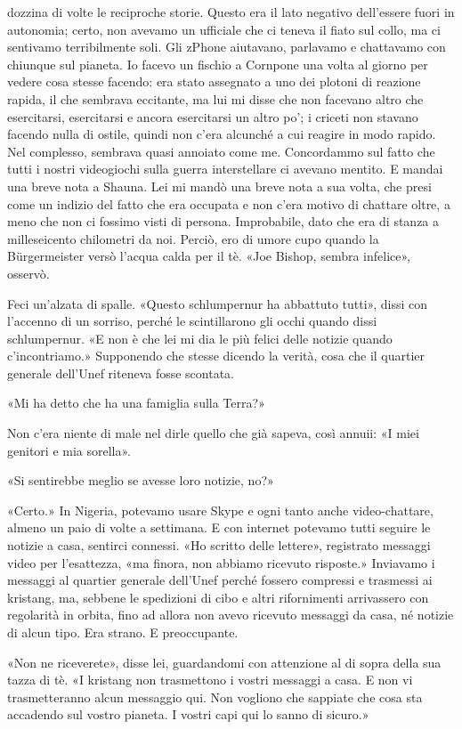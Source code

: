 dozzina di volte le reciproche storie. Questo era il lato negativo
dell'essere fuori in autonomia; certo, non avevamo un ufficiale che ci
teneva il fiato sul collo, ma ci sentivamo terribilmente soli. Gli
zPhone aiutavano, parlavamo e chattavamo con chiunque sul pianeta. Io
facevo un fischio a Cornpone una volta al giorno per vedere cosa stesse
facendo: era stato assegnato a uno dei plotoni di reazione rapida, il
che sembrava eccitante, ma lui mi disse che non facevano altro che
esercitarsi, esercitarsi e ancora esercitarsi un altro po'; i criceti
non stavano facendo nulla di ostile, quindi non c'era alcunché a cui
reagire in modo rapido. Nel complesso, sembrava quasi annoiato come me.
Concordammo sul fatto che tutti i nostri videogiochi sulla guerra
interstellare ci avevano mentito. E mandai una breve nota a Shauna. Lei
mi mandò una breve nota a sua volta, che presi come un indizio del fatto
che era occupata e non c'era motivo di chattare oltre, a meno che non ci
fossimo visti di persona. Improbabile, dato che era di stanza a
milleseicento chilometri da noi. Perciò, ero di umore cupo quando la
Bürgermeister versò l'acqua calda per il tè. «Joe Bishop, sembra
infelice», osservò.

Feci un'alzata di spalle. «Questo schlumpernur ha abbattuto tutti»,
dissi con l'accenno di un sorriso, perché le scintillarono gli occhi
quando dissi schlumpernur. «E non è che lei mi dia le più felici delle
notizie quando c'incontriamo.» Supponendo che stesse dicendo la verità,
cosa che il quartier generale dell'Unef riteneva fosse scontata.

«Mi ha detto che ha una famiglia sulla Terra?»

Non c'era niente di male nel dirle quello che già sapeva, così annuii:
«I miei genitori e mia sorella».

«Si sentirebbe meglio se avesse loro notizie, no?»

«Certo.» In Nigeria, potevamo usare Skype e ogni tanto anche
video-chattare, almeno un paio di volte a settimana. E con internet
potevamo tutti seguire le notizie a casa, sentirci connessi. «Ho scritto
delle lettere», registrato messaggi video per l'esattezza, «ma finora,
non abbiamo ricevuto risposte.» Inviavamo i messaggi al quartier
generale dell'Unef perché fossero compressi e trasmessi ai kristang, ma,
sebbene le spedizioni di cibo e altri rifornimenti arrivassero con
regolarità in orbita, fino ad allora non avevo ricevuto messaggi da
casa, né notizie di alcun tipo. Era strano. E preoccupante.

«Non ne riceverete», disse lei, guardandomi con attenzione al di sopra
della sua tazza di tè. «I kristang non trasmettono i vostri messaggi a
casa. E non vi trasmetteranno alcun messaggio qui. Non vogliono che
sappiate che cosa sta accadendo sul vostro pianeta. I vostri capi qui lo
sanno di sicuro.»

